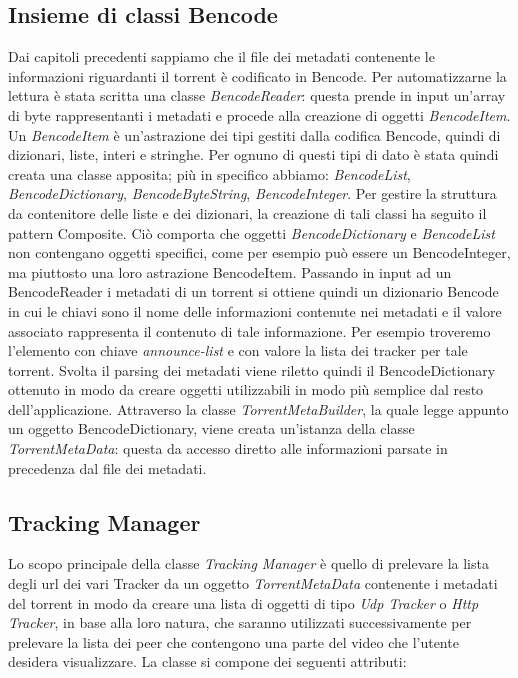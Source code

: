 \documentclass[a4]{book}
\begin{document}
\subsection{Insieme di classi Bencode}
Dai capitoli precedenti sappiamo che il file dei metadati contenente le informazioni riguardanti il torrent è codificato in Bencode. Per automatizzarne la lettura è stata scritta una classe \textit{BencodeReader}: questa prende in input un'array di byte rappresentanti i metadati e procede alla creazione di oggetti \textit{BencodeItem}. Un \textit{BencodeItem} è un'astrazione dei tipi gestiti dalla codifica Bencode, quindi di dizionari, liste, interi e stringhe.\newline
Per ognuno di questi tipi di dato è stata quindi creata una classe apposita; più in specifico abbiamo: \textit{BencodeList}, \textit{BencodeDictionary}, \textit{BencodeByteString}, \textit{BencodeInteger}.\newline
Per gestire la struttura da contenitore delle liste e dei dizionari, la creazione di tali classi ha seguito il pattern Composite. Ciò comporta che oggetti \textit{BencodeDictionary} e \textit{BencodeList} non contengano oggetti specifici, come per esempio può essere un BencodeInteger, ma piuttosto una loro astrazione BencodeItem.\newline
Passando in input ad un BencodeReader i metadati di un torrent si ottiene quindi un dizionario Bencode in cui le chiavi sono il nome delle informazioni contenute nei metadati e il valore associato rappresenta il contenuto di tale informazione. Per esempio troveremo l'elemento con chiave \textit{announce-list} e con valore la lista dei tracker per tale torrent.\newline\newline
Svolta il parsing dei metadati viene riletto quindi il BencodeDictionary ottenuto in modo da creare oggetti utilizzabili in modo più semplice dal resto dell'applicazione.
Attraverso la classe \textit{TorrentMetaBuilder}, la quale legge appunto un oggetto BencodeDictionary, viene creata un'istanza della classe \textit{TorrentMetaData}: questa da accesso diretto alle informazioni parsate in precedenza dal file dei metadati.\newline

\subsection{Tracking Manager}
Lo scopo principale della classe \textit{Tracking Manager} è quello di prelevare la lista degli url dei vari Tracker da un oggetto \textit{TorrentMetaData} contenente i metadati del torrent in modo da creare una lista di oggetti di tipo \textit{Udp Tracker} o \textit{Http Tracker}, in base alla loro natura, che saranno utilizzati successivamente per prelevare la lista dei peer che contengono una parte del video che l'utente desidera visualizzare.
La classe si compone dei seguenti attributi:
\end{document}
